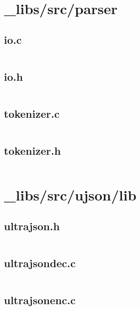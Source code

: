 \documentclass{article}
\begin{document}
\section{\_libs/src/parser}

\subsection{io.c}
\inputminted{c}{/home/dufferzafar/dev/@clones/pandas/pandas/_libs/src/parser/io.c}
\newpage

\subsection{io.h}
\inputminted{c}{/home/dufferzafar/dev/@clones/pandas/pandas/_libs/src/parser/io.h}
\newpage

\subsection{tokenizer.c}
\inputminted{c}{/home/dufferzafar/dev/@clones/pandas/pandas/_libs/src/parser/tokenizer.c}
\newpage

\subsection{tokenizer.h}
\inputminted{c}{/home/dufferzafar/dev/@clones/pandas/pandas/_libs/src/parser/tokenizer.h}
\newpage

\section{\_libs/src/ujson/lib}

\subsection{ultrajson.h}
\inputminted{c}{/home/dufferzafar/dev/@clones/pandas/pandas/_libs/src/ujson/lib/ultrajson.h}
\newpage

\subsection{ultrajsondec.c}
\inputminted{c}{/home/dufferzafar/dev/@clones/pandas/pandas/_libs/src/ujson/lib/ultrajsondec.c}
\newpage

\subsection{ultrajsonenc.c}
\inputminted{c}{/home/dufferzafar/dev/@clones/pandas/pandas/_libs/src/ujson/lib/ultrajsonenc.c}
\newpage
\end{document}
